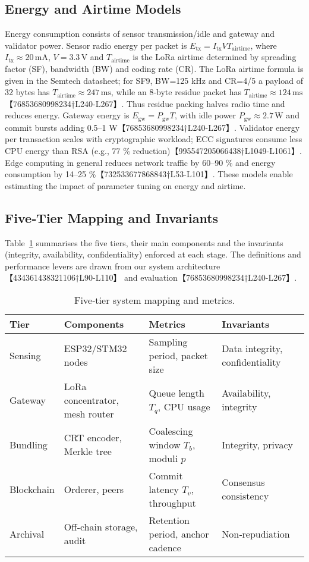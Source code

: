 \subsection{Energy and Airtime Models}
Energy consumption consists of sensor transmission/idle and gateway and validator power.
Sensor radio energy per packet is \(E_{\text{tx}} = I_{\text{tx}} V T_{\text{airtime}}\), where
\(I_{\text{tx}}\approx20\,\text{mA}\), \(V=3.3\,\text{V}\) and \(T_{\text{airtime}}\) is the
LoRa airtime determined by spreading factor (SF), bandwidth (BW) and coding rate (CR).  The
LoRa airtime formula is given in the Semtech datasheet; for SF9, BW=125 kHz and CR=4/5 a
payload of 32 bytes has \(T_{\text{airtime}}\approx247\,\text{ms}\), while an 8‑byte residue
packet has \(T_{\text{airtime}}\approx124\,\text{ms}\)【76853680998234†L240-L267】.  Thus residue packing halves
radio time and reduces energy.  Gateway energy is \(E_{\text{gw}} = P_{\text{gw}} T\), with
idle power \(P_{\text{gw}}\approx2.7\,\text{W}\) and commit bursts adding 0.5–1 W【76853680998234†L240-L267】.
Validator energy per transaction scales with cryptographic workload; ECC signatures
consume less CPU energy than RSA (e.g., 77 \% reduction)【995547205066438†L1049-L1061】.  Edge computing in
general reduces network traffic by 60–90 \% and energy consumption by 14–25 \%【732533677868843†L53-L101】.
These models enable estimating the impact of parameter tuning on energy and airtime.

\subsection{Five‑Tier Mapping and Invariants}
Table~\ref{tab:tier-map} summarises the five tiers, their main components and the
invariants (integrity, availability, confidentiality) enforced at each stage.  The
definitions and performance levers are drawn from our system architecture【434361438321106†L90-L110】 and
evaluation【76853680998234†L240-L267】.
\begin{table}[ht]
  \centering
  \caption{Five‑tier system mapping and metrics.}
  \label{tab:tier-map}
  \begin{tabular}{l l l l}
    \toprule
    \textbf{Tier} & \textbf{Components} & \textbf{Metrics} & \textbf{Invariants} \\
    \midrule
    Sensing & ESP32/STM32 nodes & Sampling period, packet size & Data integrity, confidentiality \\
    Gateway & LoRa concentrator, mesh router & Queue length \(T_q\), CPU usage & Availability, integrity \\
    Bundling & CRT encoder, Merkle tree & Coalescing window \(T_b\), moduli \(p\) & Integrity, privacy \\
    Blockchain & Orderer, peers & Commit latency \(T_v\), throughput & Consensus consistency \\
    Archival & Off‑chain storage, audit & Retention period, anchor cadence & Non‑repudiation \\
    \bottomrule
  \end{tabular}
\end{table}

